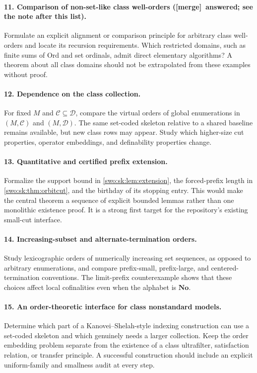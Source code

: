 \documentclass[11pt]{article}
\theoremstyle{definition}
\theoremstyle{remark}
\newcommand{\No}{\mathbf{No}}
\newcommand{\Ord}{\mathrm{Ord}}
\newcommand{\merge}{\textsf{[merge]}}
\begin{document}
\paragraph{11. Comparison of non-set-like class well-orders (\merge\ answered; see the note after this list).}
Formulate an explicit alignment or comparison principle for arbitrary
class well-orders and locate its recursion requirements. Which
restricted domains, such as finite sums of $\Ord$ and set ordinals,
admit direct elementary algorithms? A theorem about all class domains
should not be extrapolated from these examples without proof.

\paragraph{12. Dependence on the class collection.}
For fixed $M$ and $\mathcal C\subseteq\mathcal D$, compare the virtual
orders of global enumerations in $(M,\mathcal C)$ and
$(M,\mathcal D)$. The same set-coded skeleton relative to a shared
baseline remains available, but new class rows may appear. Study which
higher-size cut properties, operator embeddings, and definability
properties change.

\paragraph{13. Quantitative and certified prefix extension.}
Formalize the support bound in \cref{swo:sk:lem:extension}, the forced-prefix
length in \cref{swo:sk:thm:orbitcut}, and the birthday of its stopping entry.
This would make the central theorem a sequence of explicit bounded
lemmas rather than one monolithic existence proof. It is a strong
first target for the repository's existing small-cut interface.

\paragraph{14. Increasing-subset and alternate-termination orders.}
Study lexicographic orders of numerically increasing set sequences,
as opposed to arbitrary enumerations, and compare prefix-small,
prefix-large, and centered-termination conventions. The limit-prefix
counterexample shows that these choices affect local cofinalities even
when the alphabet is $\No$.

\paragraph{15. An order-theoretic interface for class nonstandard models.}
Determine which part of a Kanovei--Shelah-style indexing construction
can use a set-coded skeleton and which genuinely needs a larger
collection. Keep the order embedding problem separate from the
existence of a class ultrafilter, satisfaction relation, or transfer
principle. A successful construction should include an explicit
uniform-family and smallness audit at every step.
\end{document}
